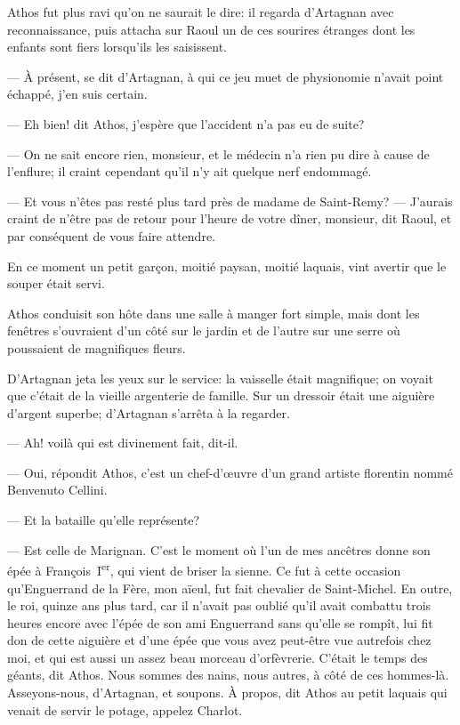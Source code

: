 Athos fut plus ravi qu'on ne saurait le dire: il regarda d'Artagnan avec reconnaissance, puis attacha sur Raoul un de ces sourires étranges dont les enfants sont fiers lorsqu'ils les saisissent.

— À présent, se dit d'Artagnan, à qui ce jeu muet de physionomie n'avait point échappé, j'en suis certain.

— Eh bien! dit Athos, j'espère que l'accident n'a pas eu de suite?

— On ne sait encore rien, monsieur, et le médecin n'a rien pu dire à cause de l'enflure; il craint cependant qu'il n'y ait quelque nerf endommagé.

— Et vous n'êtes pas resté plus tard près de madame de Saint-Remy?
— J'aurais craint de n'être pas de retour pour l'heure de votre dîner, monsieur, dit Raoul, et par conséquent de vous faire attendre.

En ce moment un petit garçon, moitié paysan, moitié laquais, vint avertir que le souper était servi.

Athos conduisit son hôte dans une salle à manger fort simple, mais dont les fenêtres s'ouvraient d'un côté sur le jardin et de l'autre sur une serre où poussaient de magnifiques fleurs.

D'Artagnan jeta les yeux sur le service: la vaisselle était magnifique; on voyait que c'était de la vieille argenterie de famille. Sur un dressoir était une aiguière d'argent superbe; d'Artagnan s'arrêta à la regarder.

— Ah! voilà qui est divinement fait, dit-il.

— Oui, répondit Athos, c'est un chef-d'œuvre d'un grand artiste florentin nommé Benvenuto Cellini.

— Et la bataille qu'elle représente?

— Est celle de Marignan. C'est le moment où l'un de mes ancêtres donne son épée à François~I\textsuperscript{er}, qui vient de briser la sienne. Ce fut à cette occasion qu'Enguerrand de la Fère, mon aïeul, fut fait chevalier de Saint-Michel. En outre, le roi, quinze ans plus tard, car il n'avait pas oublié qu'il avait combattu trois heures encore avec l'épée de son ami Enguerrand sans qu'elle se rompît, lui fit don de cette aiguière et d'une épée que vous avez peut-être vue autrefois chez moi, et qui est aussi un assez beau morceau d'orfèvrerie. C'était le temps des géants, dit Athos. Nous sommes des nains, nous autres, à côté de ces hommes-là. Asseyons-nous, d'Artagnan, et soupons. À propos, dit Athos au petit laquais qui venait de servir le potage, appelez Charlot.

